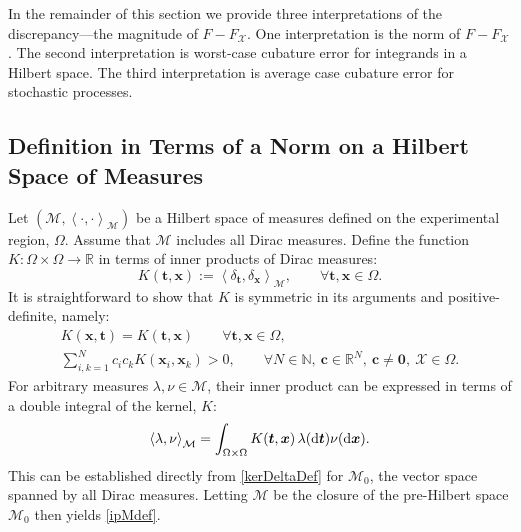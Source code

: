 \documentclass[graybox]{svmult}
\newcommand{\reals}{\mathbb{R}}
\newcommand{\vc}{\boldsymbol{c}}
\newcommand{\vx}{\boldsymbol{x}}
\newcommand{\vt}{\boldsymbol{t}}
\newcommand{\vzero}{\boldsymbol{0}}
\newcommand{\dif}{{\rm d}}
\newcommand{\Xdes}{\mathcal{X}}
\newcommand{\FXdes}{F_{\Xdes}}
\newcommand{\cm}{\mathcal{M}}
\newcommand{\Ftar}{F}
\newcommand{\ip}[3][{}]{\ensuremath{\left \langle #2, #3 \right \rangle_{#1}}}
\begin{document}
In the remainder of this section we provide three interpretations of the discrepancy---the magnitude of $\Ftar - \FXdes$.  One interpretation is the norm of $\Ftar - \FXdes$.  The second interpretation is worst-case cubature error for integrands in a Hilbert space.  The third interpretation is average case cubature error for stochastic processes.

\subsection{Definition in Terms of a Norm on a Hilbert Space of Measures}

Let $(\cm, \ip[\cm]{\cdot}{\cdot})$ be a Hilbert space of measures defined on the experimental region, $\Omega$.  Assume that $\cm$ includes all Dirac measures.  Define the function $K:\Omega \times \Omega \to \reals$ in terms of inner products of Dirac measures:
\begin{equation} \label{kerDeltaDef}
    K(\vt,\vx) := \ip[\cm]{\delta_{\vt}}{\delta_{\vx}}, \qquad \forall \vt, \vx \in \Omega.
\end{equation}
It is straightforward to show that $ K$ is symmetric in its arguments and positive-definite, namely:
\begin{gather*}
K(\vx, \vt) = K(\vt, \vx) \qquad \forall \vt, \vx\in \Omega,\\
\sum\limits_{i, k=1}^N c_i c_k  K(\vx_i,\vx_k) > 0, \qquad \forall N\in\mathbb{N}, \  \vc \in\mathbb{R}^N, \ \vc \ne \vzero,  \ \Xdes \in\Omega.
\end{gather*}
For arbitrary measures $\lambda, \nu \in \cm$, their inner product can be expressed in terms of a double integral of the kernel, $K$:
\begin{equation} \label{ipMdef}
    \ip[\cm]{\lambda}{\nu} = \int_{\Omega \times \Omega} K(\vt,\vx) \, \lambda(\dif \vt) \nu(\dif \vx).
\end{equation}
This can be established directly from \eqref{kerDeltaDef} for $\cm_0$, the vector space spanned by all Dirac measures.  Letting $\cm$ be the closure of the pre-Hilbert space $\cm_0$ then yields \eqref{ipMdef}.
\end{document}
